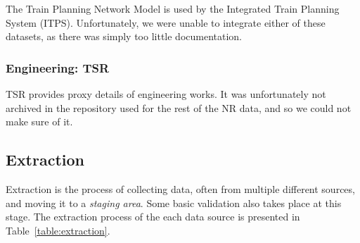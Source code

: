 \documentclass[12pt,a4paper]{article}
\begin{document}
The Train Planning Network Model is used by the Integrated Train Planning System (ITPS). Unfortunately, we were unable to integrate either of these datasets, as there was simply too little documentation.

\subsubsection{Engineering: TSR}

TSR provides proxy details of engineering works. It was unfortunately not archived in the repository used for the rest of the NR data, and so we could not make sure of it.

\subsection{Extraction}

Extraction is the process of collecting data, often from multiple different sources, and moving it to a \textit{staging area}. Some basic validation also takes place at this stage. The extraction process of the each data source is presented in Table~\ref{table:extraction}.
\end{document}
